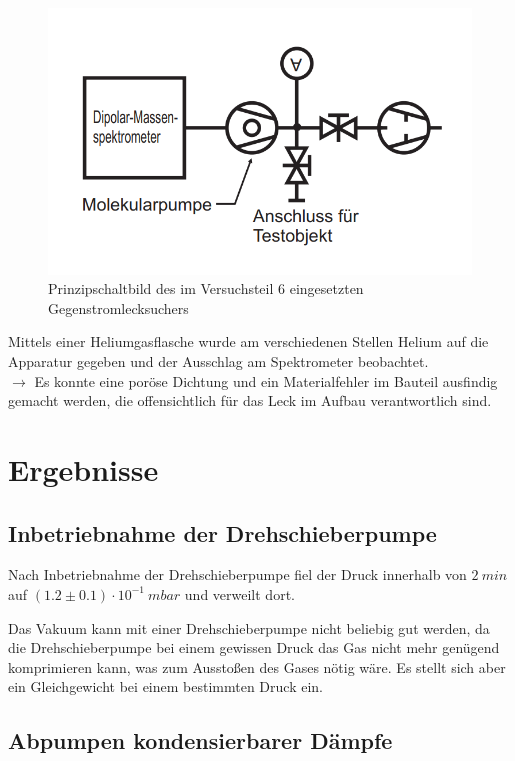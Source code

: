 \documentclass[12pt, a4paper]{scrartcl}
\begin{document}
		\begin{figure}[H]
			\centering
			\includegraphics[width=.3\paperwidth]{aufbau262}
			\caption{Prinzipschaltbild des im Versuchsteil 6 eingesetzten Gegenstromlecksuchers}
			\label{fig:anord6}
		\end{figure}
		Mittels einer Heliumgasflasche wurde am verschiedenen Stellen Helium auf die Apparatur gegeben und der Ausschlag am Spektrometer beobachtet.\\
		$\rightarrow$ Es konnte eine poröse Dichtung und ein Materialfehler im Bauteil ausfindig gemacht werden, die offensichtlich für das Leck im Aufbau verantwortlich sind.

	\section{Ergebnisse}
	\subsection{Inbetriebnahme der Drehschieberpumpe}
	
		Nach Inbetriebnahme der Drehschieberpumpe fiel der Druck innerhalb von
        $2\ min$
        auf 
        $(1.2\pm0.1)\cdot 10^{-1}\ mbar$
        und verweilt dort.
		
		Das Vakuum kann mit einer Drehschieberpumpe nicht beliebig gut werden, da die Drehschieberpumpe bei einem gewissen Druck das Gas nicht mehr genügend komprimieren kann, was zum Ausstoßen des Gases nötig wäre.
		Es stellt sich aber ein Gleichgewicht bei einem bestimmten Druck ein.
        		
	\subsection{Abpumpen kondensierbarer Dämpfe}
		
\end{document}
